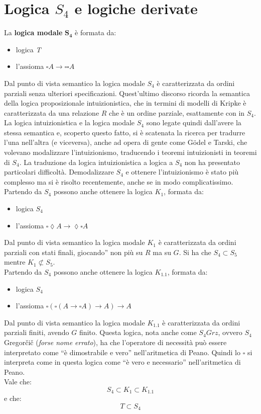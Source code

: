 \documentclass[a4paper,12pt, oneside]{book}
\begin{document}
\section{Logica $S_4$ e logiche derivate}
La \textbf{logica modale} $\mathbf{S_4}$ è formata da:
\begin{itemize}
  \item logica \textit{T}
  \item l'assioma $\square A\to \square\square A$
\end{itemize}
Dal punto di vista semantico la logica modale $S_4$ è caratterizzata da ordini
parziali senza ulteriori specificazioni. Quest'ultimo discorso ricorda la
semantica della logica proposizionale intuizionistica, che in termini di modelli
di Kripke è caratterizzata da una relazione $R$ che è un ordine parziale,
esattamente con in $S_4$. La logica intuizionistica e la logica modale $S_4$
sono legate quindi dall'avere la stessa semantica e, scoperto questo fatto, si è
scatenata la ricerca per tradurre l'una nell'altra (e viceversa), anche ad opera
di gente come G\"{o}del e Tarski, che volevano modalizzare l'intuizionismo,
traducendo i teoremi intuizionisti in teoremi di $S_4$. La traduzione da
logica intuizionistica a logica a $S_4$ non ha
presentato particolari difficoltà. Demodalizzare $S_4$ e ottenere
l'intuizionismo è stato più complesso ma si è risolto recentemente, anche se in
modo complicatissimo. \\
Partendo da $S_4$ possono anche ottenere la logica $K_1$, formata da:
\begin{itemize}
  \item logica $S_4$
  \item l'assioma $\square\lozenge A\to \lozenge\square A$
\end{itemize}
Dal punto di vista semantico la logica modale $K_1$ è caratterizzata da ordini
parziali con stati finali, giocando'' non più su $R$ ma su $G$. Si ha che
$S_4\subset S_5$ mentre $K_1\not\subset S_5$. \\
Partendo da $S_4$ possono anche ottenere la logica $K_{1.1}$, formata da:
\begin{itemize}
  \item logica $S_4$
  \item l'assioma $\square(\square(A\to\square A)\to A)\to A$
\end{itemize}
Dal punto di vista semantico la logica modale $K_{1.1}$ è caratterizzata da
ordini parziali finiti, avendo $G$ finito. Questa logica, nota anche come
$S_4Grz$, ovvero $S_4$ Gregor\v{c}i\v{c} (\textit{forse nome errato}), ha che
l'operatore 
di necessità può essere interpretato come ``è dimostrabile e vero''
nell'aritmetica di Peano. Quindi lo $\square$ si interpreta come in questa
logica come ``è vero e necessario'' nell'aritmetica di Peano. \\
Vale che:
\[S_4\subset K_1\subset K_{1.1}\]
e che:
\[T\subset S_4\]
\end{document}
